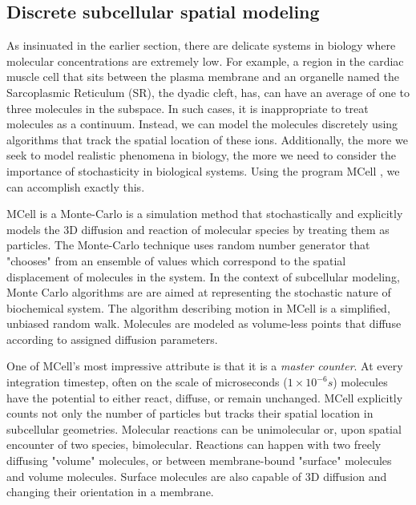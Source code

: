 \documentclass[12pt]{ucsddissertation}
\begin{document}
\begin{dissertationintroduction}

\subsection{Discrete subcellular spatial modeling}
As insinuated in the earlier section, there are delicate systems in biology where molecular concentrations are extremely low. For example, a region in the cardiac muscle cell that sits between the plasma membrane and an organelle named the Sarcoplasmic Reticulum (SR), the dyadic cleft, has, can have an average of one to three molecules in the subspace. In such cases, it is inappropriate to treat molecules as a continuum. Instead, we can model the molecules discretely using algorithms that track the spatial location of these ions. Additionally, the more we seek to model realistic phenomena in biology, the more we need to consider the importance of stochasticity in biological systems. Using the program MCell \cite{Stiles2001a,Kerr2008}, we can accomplish exactly this. 

MCell is a Monte-Carlo is a simulation method that stochastically and explicitly models the 3D diffusion and reaction of molecular species by treating them as particles. The Monte-Carlo technique uses random number generator that "chooses" from an ensemble of values which correspond to the spatial displacement of molecules in the system. In the context of subcellular modeling, Monte Carlo algorithms are are aimed at representing the stochastic nature of biochemical system. The algorithm describing motion in MCell is a simplified, unbiased random walk. Molecules are modeled as volume-less points that diffuse according to assigned diffusion parameters. 

One of MCell's most impressive attribute is that it is a \textit{master counter}. At every integration timestep, often on the scale of microseconds ($1 \times 10^{-6}s$) molecules have the potential to either react, diffuse, or remain unchanged. MCell explicitly counts not only the number of particles but tracks their spatial location in subcellular geometries. Molecular reactions can be unimolecular or, upon spatial encounter of two species, bimolecular. Reactions can happen with two freely diffusing "volume" molecules, or between membrane-bound "surface" molecules and volume molecules. Surface molecules are also capable of 3D diffusion and changing their orientation in a membrane. 


\end{dissertationintroduction}
\end{document}
